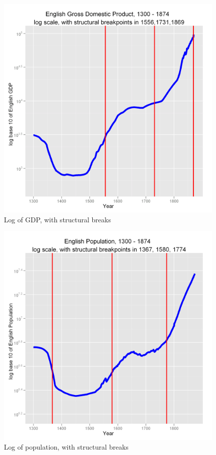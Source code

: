 \documentclass[final]{beamer}
\begin{document}
\begin{frame}
\begin{figure}[p!]
\center
\caption{Log of GDP, with structural breaks}
\label{fig:gbpgdplog.png}
\includegraphics[height=0.8\textheight]{gbpgdplog.png}
\end{figure}
\end{frame}

\begin{frame}
\begin{figure}[p!]
\center
\caption{Log of population, with structural breaks}
\label{fig:popLog}
\includegraphics[height=0.8\textheight]{popLog}
\end{figure}
\end{frame}
\end{document}
